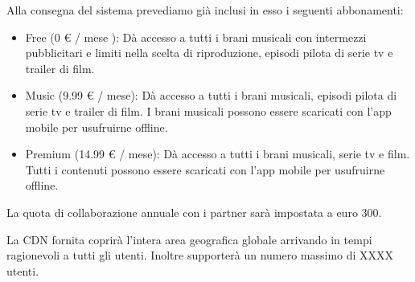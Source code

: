 \begin{flushleft}
    {Alla consegna del sistema prevediamo già inclusi in esso i seguenti abbonamenti:}
    
    \begin{itemize}
        \item {Free (0 € / mese ): Dà accesso a tutti i brani musicali con intermezzi pubblicitari e limiti nella scelta di riproduzione, episodi pilota di serie tv e trailer di film.}
        
        \item {Music (9.99 € / mese): Dà accesso a tutti i brani musicali, episodi pilota di serie tv e trailer di film. I brani musicali possono essere scaricati con l’app mobile per usufruirne offline.}
        
        \item {Premium (14.99 € / mese): Dà accesso a tutti i brani musicali, serie tv e film. Tutti i contenuti possono essere scaricati con l’app mobile per usufruirne offline.}
    \end{itemize}
\end{flushleft}

\begin{flushleft}
    {La quota di collaborazione annuale con i partner sarà impostata a euro 300.} 
\end{flushleft}

\begin{flushleft}
    {La CDN fornita coprirà l’intera area geografica globale arrivando in tempi ragionevoli a tutti gli utenti. Inoltre supporterà un numero massimo di XXXX utenti.}
\end{flushleft}